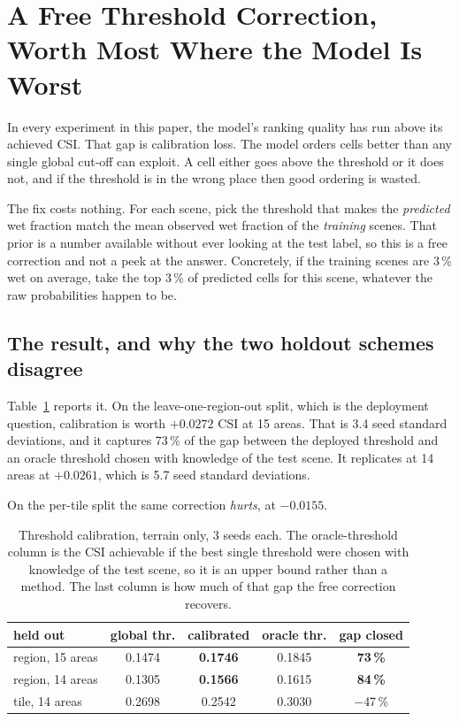 \section{A Free Threshold Correction, Worth Most Where the Model Is Worst}
\label{sec:calibration}

In every experiment in this paper, the model's ranking quality has run above its achieved CSI. That
gap is calibration loss. The model orders cells better than any single global cut-off can exploit.
A cell either goes above the threshold or it does not, and if the threshold is in the wrong place
then good ordering is wasted.

The fix costs nothing. For each scene, pick the threshold that makes the \emph{predicted} wet
fraction match the mean observed wet fraction of the \emph{training} scenes. That prior is a number
available without ever looking at the test label, so this is a free correction and not a peek at the
answer. Concretely, if the training scenes are 3\,\% wet on average, take the top 3\,\% of predicted
cells for this scene, whatever the raw probabilities happen to be.

\subsection{The result, and why the two holdout schemes disagree}
Table~\ref{tab:calibration} reports it. On the leave-one-region-out split, which is the deployment
question, calibration is worth $+0.0272$ CSI at 15 areas. That is 3.4 seed standard deviations, and
it captures 73\,\% of the gap between the deployed threshold and an oracle threshold chosen with
knowledge of the test scene. It replicates at 14 areas at $+0.0261$, which is 5.7 seed standard
deviations.

On the per-tile split the same correction \emph{hurts}, at $-0.0155$.

\begin{table}[!t]
\centering
\caption{Threshold calibration, terrain only, 3 seeds each. The oracle-threshold column is the CSI
achievable if the best single threshold were chosen with knowledge of the test scene, so it is an
upper bound rather than a method. The last column is how much of that gap the free correction
recovers.}
\label{tab:calibration}
\begin{tabular}{lcccc}
\toprule
held out & global thr. & calibrated & oracle thr. & gap closed \\
\midrule
region, 15 areas & 0.1474 & \textbf{0.1746} & 0.1845 & \textbf{73\,\%} \\
region, 14 areas & 0.1305 & \textbf{0.1566} & 0.1615 & \textbf{84\,\%} \\
tile, 14 areas   & 0.2698 & 0.2542 & 0.3030 & $-$47\,\% \\
\bottomrule
\end{tabular}
\end{table}

